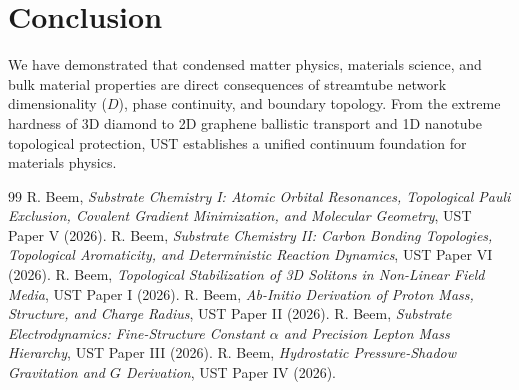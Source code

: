 \documentclass[11pt,a4paper]{article}
\begin{document}
	\section{Conclusion}
	\label{sec:conclusion}
	
	We have demonstrated that condensed matter physics, materials science, and bulk material properties are direct consequences of streamtube network dimensionality ($D$), phase continuity, and boundary topology. From the extreme hardness of 3D diamond to 2D graphene ballistic transport and 1D nanotube topological protection, UST establishes a unified continuum foundation for materials physics.
	
	\begin{thebibliography}{99}
		 R. Beem, \textit{Substrate Chemistry I: Atomic Orbital Resonances, Topological Pauli Exclusion, Covalent Gradient Minimization, and Molecular Geometry}, UST Paper V (2026).
		 R. Beem, \textit{Substrate Chemistry II: Carbon Bonding Topologies, Topological Aromaticity, and Deterministic Reaction Dynamics}, UST Paper VI (2026).
		 R. Beem, \textit{Topological Stabilization of 3D Solitons in Non-Linear Field Media}, UST Paper I (2026).
		 R. Beem, \textit{Ab-Initio Derivation of Proton Mass, Structure, and Charge Radius}, UST Paper II (2026).
		 R. Beem, \textit{Substrate Electrodynamics: Fine-Structure Constant $\alpha$ and Precision Lepton Mass Hierarchy}, UST Paper III (2026).
		 R. Beem, \textit{Hydrostatic Pressure-Shadow Gravitation and $G$ Derivation}, UST Paper IV (2026).
	\end{thebibliography}
	
\end{document}
